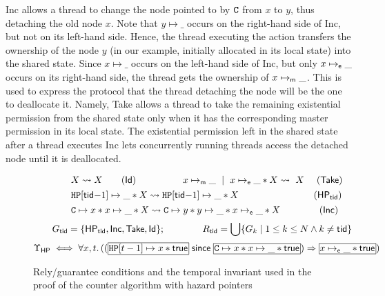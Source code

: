 \textsf{Inc} allows a thread to change the node pointed to by $\texttt{C}$ from $x$ to
$y$, thus detaching the old node $x$. Note that $y \mapsto \_$ occurs on the
right-hand side of \textsf{Inc}, but not on its left-hand side. Hence, the
thread executing the action transfers the ownership of the node $y$ (in our
example, initially allocated in its local state) into the shared state. Since $x
\mapsto \_$ occurs on the left-hand side of \textsf{Inc}, but only $x
\mapsto_{\sf e} \_$ occurs on its right-hand side, the thread gets the ownership of 
$x \mapsto_{\sf m} \_$. This is used to express the protocol that the thread 
detaching the node will be the one to deallocate it. Namely,
\textsf{Take} allows a thread to take the remaining existential
permission from the shared state only when it has the corresponding master
permission in its local state. The existential permission left in the shared
state after a thread executes \textsf{Inc} lets concurrently running threads 
access the detached node until it is deallocated.




\begin{figure}[t]
{\small
\begin{align*}
& \qquad \qquad X \leadsto X \qquad (\textsf{Id})
\qquad\qquad\quad
x \mapsto_\sm \_ \ \mid\ x \mapsto_\se \_ * X \leadsto\ X \quad\ (\textsf{Take})
\\[1pt]
&\qquad \qquad 
\HP[\ltid {-} 1] \mapsto \_ * X \leadsto \HP[\ltid {-} 1] \mapsto \_ * X 
\qquad\qquad\qquad\qquad
(\textsf{HP}_\ltid)
\\[1pt]
&\qquad \qquad 
 \cc \mapsto x * x \mapsto \_ * X  \leadsto \cc \mapsto y * y \mapsto \_ * x \mapsto_\se \_ * X
\qquad \quad \ \ \ \, (\textsf{Inc})
\\[2pt]
&
\qquad G_\ltid = \{\textsf{HP}_\ltid, \textsf{Inc}, \textsf{Take}, \textsf{Id}\}; 
\qquad \qquad
R_\ltid = \bigcup \{G_k \mid {1 \le k \le \nthreads} \wedge {k \not= \ltid}\}
\\[2pt]
&
\Upsilon_{\textsf{HP}} \iff  
\forall x, t.\, ((\shareds{\HP[t - 1] \mapsto x * \true} 
\since {}
\shareds{\cc \mapsto x * x \mapsto \_ * \true}) \Rightarrow 
\shareds{x \mapsto_\se \_* \true})
\end{align*}
}
\vspace{-15pt}
\caption{\label{fig:HazardRG}\small Rely/guarantee conditions and the temporal
  invariant used in the proof of the counter algorithm with hazard pointers}
\end{figure}

